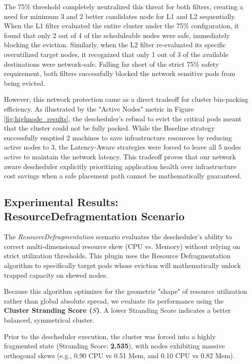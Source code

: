 The 75\% threshold completely neutralized this threat for both filters, creating a need for minimum 3 and 2 better candidates node for L1 and L2 sequentially. When the L1 filter evaluated the entire cluster under the 75\% configuration, it found that only 2 out of 4 of the scheduleable nodes were safe, immediately blocking the eviction. Similarly, when the L2 filter re-evaluated its specific overutilized target nodes, it recognized that only 1 out of 3 of the available destinations were network-safe. Falling far short of the strict 75\% safety requirement, both filters successfully blocked the network sensitive pods from being evicted.

However, this network protection came as a direct tradeoff for cluster bin-packing efficiency. As illustrated by the "Active Nodes" metric in Figure \ref{fig:highnode_results}, the descheduler's refusal to evict the critical pods meant that the cluster could not be fully packed. While the Baseline strategy successfully emptied 2 machines to save infrastructure resources by reducing active nodes to 3, the Latency-Aware strategies were forced to leave all 5 nodes active to maintain the network latency. This tradeoff proves that our network aware descheduler explicitly prioritizing application health over infrastructure cost savings when a safe placement path cannot be mathematically guaranteed.

\subsection{Experimental Results: ResourceDefragmentation Scenario}
\label{subsec:netaware4_resultanalysis3}
The \textit{ResourceDefragmentation} scenario evaluates the descheduler's ability to correct multi-dimensional resource skew (CPU vs. Memory) without relying on strict utilization thresholds. This plugin uses the Resource Defragmentation algorithm to specifically target pods whose eviction will mathematically unlock trapped capacity on skewed nodes.

Because this algorithm optimizes for the geometric "shape" of resource utilization rather than global absolute spread, we evaluate its performance using the \textbf{Cluster Stranding Score (\(S\))}. A lower Stranding Score indicates a better balanced, symmetrical cluster.

Prior to the descheduler execution, the cluster was forced into a highly fragmented state (Stranding Score: \textbf{2.535}), with nodes exhibiting massive orthogonal skews (e.g., 0.90 CPU vs 0.51 Mem, and 0.10 CPU vs 0.82 Mem).

